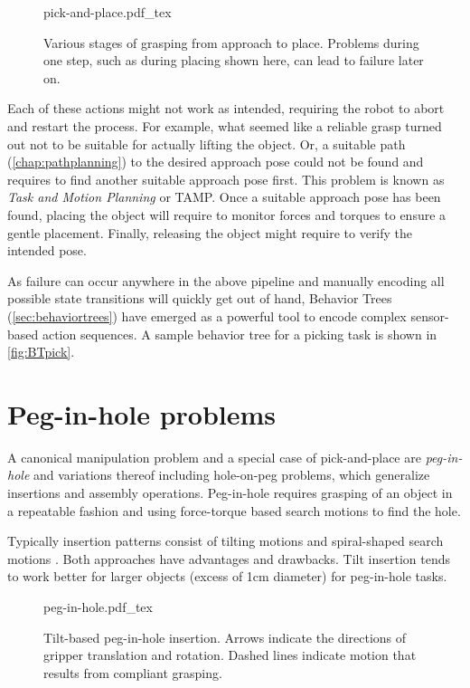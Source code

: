 \begin{figure}
	\centering
    \def\svgwidth{0.8\textwidth}
    {pick-and-place.pdf_tex}
    \caption{Various stages of grasping from approach to place. Problems during one step, such as during placing shown here, can lead to failure later on.\label{fig:pick-and-place}}
\end{figure}

Each of these actions might not work as intended, requiring the robot to abort and restart the process. For example, what seemed like a reliable grasp turned out not to be suitable for actually lifting the object. Or, a suitable path (\cref{chap:pathplanning}) to the desired approach pose could not be found and requires to find another suitable approach pose first. This problem is known as \emph{Task and Motion Planning} or TAMP. Once a suitable approach pose has been found, placing the object will require to monitor forces and torques to ensure a gentle placement. Finally, releasing the object might require to verify the intended pose. 

As failure can occur anywhere in the above pipeline and manually encoding all possible state transitions will quickly get out of hand,  Behavior Trees (\cref{sec:behaviortrees}) have emerged as a powerful tool to encode complex sensor-based action sequences. A sample behavior tree for a picking task is shown in \cref{fig:BTpick}.

\section{Peg-in-hole problems}\label{sec:peginhole}
A canonical manipulation problem and a special case of pick-and-place are \textsl{peg-in-hole} and variations thereof including hole-on-peg problems, which generalize insertions and assembly operations. Peg-in-hole requires grasping of an object in a repeatable fashion and using force-torque based search motions to find the hole. 

Typically insertion patterns consist of tilting motions and spiral-shaped search motions \cite{watson2020autonomous}. Both approaches have advantages and drawbacks. Tilt insertion tends to work better for larger objects (excess of 1cm diameter) for peg-in-hole tasks. 

\begin{figure}
	\centering
    \def\svgwidth{0.65\textwidth}
    {peg-in-hole.pdf_tex}
    \caption{Tilt-based peg-in-hole insertion. Arrows indicate the directions of gripper translation and rotation. Dashed lines indicate motion that results from compliant grasping. \label{fig:tilt-insertion}}
\end{figure}

